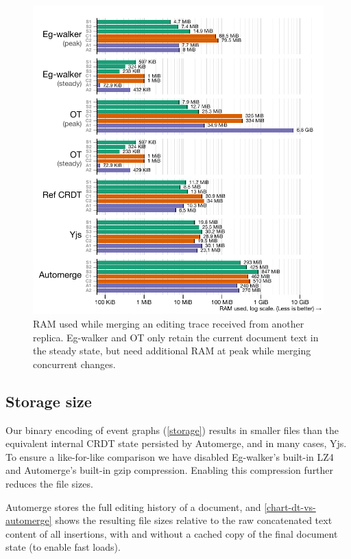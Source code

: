 \documentclass[sigplan,10pt]{acmart}
\newcommand{\algname}{Eg-walker\xspace}
\begin{document}
\begin{figure}
  \includegraphics[width=\linewidth]{diagrams/memusage.pdf}
  \caption{RAM used while merging an editing trace received from another replica. \algname and OT only retain the current document text in the steady state, but need additional RAM at peak while merging concurrent changes.}
  \label{chart-memusage}
\end{figure}

\subsection{Storage size}

Our binary encoding of event graphs (\autoref{storage}) results in smaller files than the equivalent internal CRDT state persisted by Automerge, and in many cases, Yjs.
To ensure a like-for-like comparison we have disabled \algname's built-in LZ4 and Automerge's built-in gzip compression. Enabling this compression further reduces the file sizes.


Automerge stores the full editing history of a document, and \autoref{chart-dt-vs-automerge} shows the resulting file sizes relative to the raw concatenated text content of all insertions, with and without a cached copy of the final document state (to enable fast loads).
\end{document}
